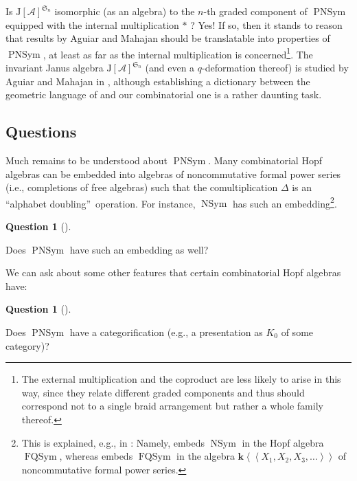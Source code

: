 \documentclass[numbers=enddot,12pt,final,onecolumn,notitlepage]{scrartcl}%
\theoremstyle{definition}
\newtheorem{quest}[theo]{Question}
\newenvironment{question}[1][]
{\begin{quest}[#1]\begin{leftbar}}
{\end{leftbar}\end{quest}}
\newenvironment{question}[1][Question]{\noindent\textbf{#1.} }{\ \rule{0.5em}{0.5em}}
\newenvironment{noncompile}{}{}
\begin{document}
\begin{noncompile}
Is $\mathrm{J}\left[  \mathcal{A}\right]  ^{\mathfrak{S}_{n}}$ isomorphic (as
an algebra) to the $n$-th graded component of $\operatorname*{PNSym}$ equipped
with the internal multiplication $\ast$ ? Yes! If so, then it stands to reason
that results by Aguiar and Mahajan should be translatable into properties of
$\operatorname*{PNSym}$, at least as far as the internal multiplication is
concerned\footnote{The external multiplication and the coproduct are less
likely to arise in this way, since they relate different graded components and
thus should correspond not to a single braid arrangement but rather a whole
family thereof.}. The invariant Janus algebra $\mathrm{J}\left[
\mathcal{A}\right]  ^{\mathfrak{S}_{n}}$ (and even a $q$-deformation thereof)
is studied by Aguiar and Mahajan in \cite[\S 1.12.3]{AguMah22}, although
establishing a dictionary between the geometric language of \cite{AguMah22}
and our combinatorial one is a rather daunting task.
\end{noncompile}

\subsection{Questions}

Much remains to be understood about $\operatorname*{PNSym}$. Many
combinatorial Hopf algebras can be embedded into algebras of noncommutative
formal power series (i.e., completions of free algebras) such that the
comultiplication $\Delta$ is an \textquotedblleft alphabet
doubling\textquotedblright\ operation. For instance, $\operatorname*{NSym}$
has such an embedding\footnote{This is explained, e.g., in \cite[\S 8.1]%
{GriRei}: Namely, \cite[Corollary 8.1.14(b)]{GriRei} embeds
$\operatorname*{NSym}$ in the Hopf algebra $\operatorname*{FQSym}$, whereas
\cite[(8.1.3)]{GriRei} embeds $\operatorname*{FQSym}$ in the algebra
$\mathbf{k}\left\langle \left\langle X_{1},X_{2},X_{3},\ldots\right\rangle
\right\rangle $ of noncommutative formal power series.}.

\begin{question}
Does $\operatorname*{PNSym}$ have such an embedding as well?
\end{question}

We can ask about some other features that certain combinatorial Hopf algebras have:

\begin{question}
Does $\operatorname*{PNSym}$ have a categorification (e.g., a presentation as
$K_{0}$ of some category)?
\end{question}
\end{document}
